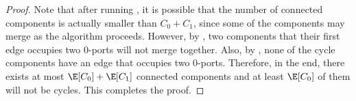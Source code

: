 \begin{proof}
    Note that after running \algtwo{}, it is possible that the number of connected components is actually smaller than $C_0 + C_1$, since some of the components may merge as the algorithm proceeds. However, by , two components that their first edge occupies two 0-ports will not merge together. Also, by , none of the cycle components have an edge that occupies two 0-ports. Therefore, in the end, there exists at most $\E[C_0] + \E[C_1]$ connected components and at least $\E[C_0]$ of them will not be cycles. This completes the proof.
    \end{proof}



